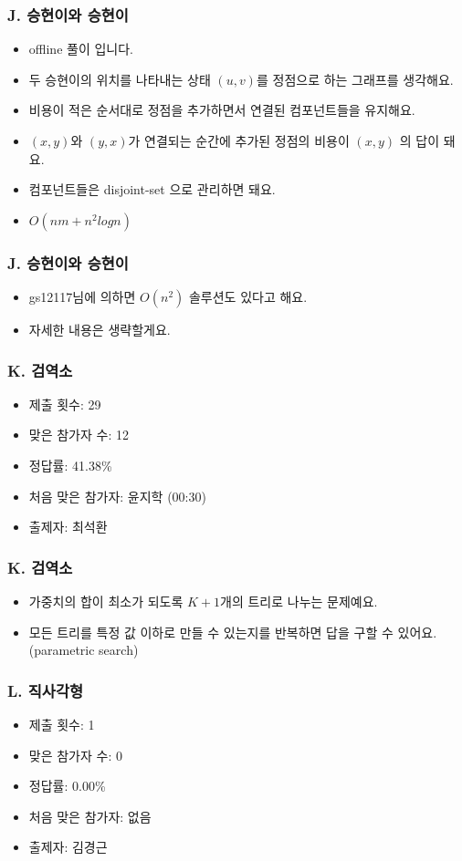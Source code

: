 \documentclass[xetex]{beamer}
\begin{document}
\begin{frame}
  \frametitle{J. 승현이와 승현이}
  \begin{itemize}
    \item offline 풀이 입니다.
    \item 두 승현이의 위치를 나타내는 상태 $(u, v)$를 정점으로 하는 그래프를 생각해요.
    \item 비용이 적은 순서대로 정점을 추가하면서 연결된 컴포넌트들을 유지해요.
    \item $(x, y)$와 $(y, x)$가 연결되는 순간에 추가된 정점의 비용이 $(x, y)$ 의 답이 돼요.
    \item 컴포넌트들은 disjoint-set 으로 관리하면 돼요.
    \item $O(n m + n^{2} log{n})$
  \end{itemize}
\end{frame}

\begin{frame}
  \frametitle{J. 승현이와 승현이}
  \begin{itemize}
    \item gs12117님에 의하면 $O(n^{2})$ 솔루션도 있다고 해요.
    \item 자세한 내용은 생략할게요.
  \end{itemize}
\end{frame}

\begin{frame}
  \frametitle{K. 검역소}
  \begin{itemize}
    \item 제출 횟수: 29
    \item 맞은 참가자 수: 12
    \item 정답률: 41.38\%
    \item 처음 맞은 참가자: 윤지학 (00:30)
    \item 출제자: 최석환
  \end{itemize}
\end{frame}

\begin{frame}
  \frametitle{K. 검역소}
  \begin{itemize}
    \item 가중치의 합이 최소가 되도록 $K+1$개의 트리로 나누는 문제예요.
    \item 모든 트리를 특정 값 이하로 만들 수 있는지를 반복하면 답을 구할 수 있어요. (parametric search)
  \end{itemize}
\end{frame}

\begin{frame}
  \frametitle{L. 직사각형}
  \begin{itemize}
    \item 제출 횟수: 1
    \item 맞은 참가자 수: 0
    \item 정답률: 0.00\%
    \item 처음 맞은 참가자: 없음
    \item 출제자: 김경근
  \end{itemize}
\end{frame}
\end{document}
